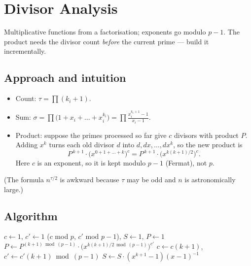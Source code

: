 \section{Divisor Analysis}
\label{sec:n-div-analysis}


\begin{patternbox}
Multiplicative functions from a factorisation; exponents go modulo $p-1$.
The product needs the divisor count \emph{before} the current prime --- build
it incrementally.
\end{patternbox}

\subsection*{Approach and intuition}

\begin{itemize}
  \item Count: $\tau=\prod(k_i+1)$.
  \item Sum: $\sigma=\prod\bigl(1+x_i+\dots+x_i^{k_i}\bigr)=\prod\frac{x_i^{k_i+1}-1}{x_i-1}$.
  \item Product: suppose the primes processed so far give $c$ divisors with
        product $P$. Adding $x^k$ turns each old divisor $d$ into
        $d,dx,\dots,dx^k$, so the new product is
        \[
          P^{\,k+1}\cdot\bigl(x^{0+1+\dots+k}\bigr)^{c}=P^{\,k+1}\cdot\bigl(x^{k(k+1)/2}\bigr)^{c}.
        \]
        Here $c$ is an exponent, so it is kept modulo $p-1$ (Fermat), not $p$.
\end{itemize}
(The formula $n^{\tau/2}$ is awkward because $\tau$ may be odd and $n$ is
astronomically large.)

\subsection*{Algorithm}
\begin{algorithmic}[1]
\State $c\gets1$, $c'\gets1$ ($c$ mod $p$, $c'$ mod $p-1$), $S\gets1$, $P\gets1$
  \State $P\gets P^{(k+1)\bmod(p-1)}\cdot\bigl(x^{k(k+1)/2\bmod(p-1)}\bigr)^{c'}$
  \State $c\gets c(k+1)$, $c'\gets c'(k+1)\bmod(p-1)$
  \State $S\gets S\cdot(x^{k+1}-1)(x-1)^{-1}$
\EndFor
\end{algorithmic}

